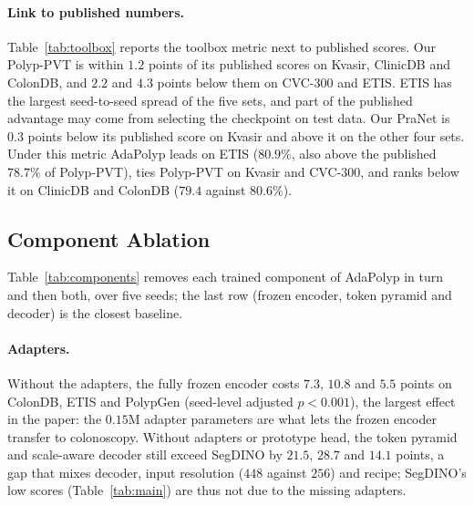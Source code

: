 \documentclass{ieeeaccess}
\begin{document}
\paragraph{Link to published numbers.} Table~\ref{tab:toolbox} reports the toolbox metric next to published scores. Our Polyp-PVT is within $1.2$ points of its published scores on Kvasir, ClinicDB and ColonDB, and $2.2$ and $4.3$ points below them on CVC-300 and ETIS. ETIS has the largest seed-to-seed spread of the five sets, and part of the published advantage may come from selecting the checkpoint on test data. Our PraNet is $0.3$ points below its published score on Kvasir and above it on the other four sets. Under this metric AdaPolyp leads on ETIS ($80.9\%$, also above the published $78.7\%$ of Polyp-PVT), ties Polyp-PVT on Kvasir and CVC-300, and ranks below it on ClinicDB and ColonDB ($79.4$ against $80.6\%$).

\subsection{Component Ablation}
\label{sec:components}
\begin{table}[!t]
  \centering
  \caption{\textbf{Component ablation of AdaPolyp.} Dice (\%) at threshold $0.5$, mean $\pm$ SD over $5$ seeds, same recipe, evaluator and T4 hardware. \mbox{\unboldmath$\Delta$}: mean Dice difference on the primary cohorts, AdaPolyp minus the variant (pp). $^{*}$: significant at the seed level after Holm correction over the three cohorts (paired $t$-test). Params and Trained in millions.}
  \label{tab:components}
  \vspace{2pt}
  \setlength{\tabcolsep}{4pt}
\end{table}
Table~\ref{tab:components} removes each trained component of AdaPolyp in turn and then both, over five seeds; the last row (frozen encoder, token pyramid and decoder) is the closest baseline.

\paragraph{Adapters.} Without the adapters, the fully frozen encoder costs $7.3$, $10.8$ and $5.5$ points on ColonDB, ETIS and PolypGen (seed-level adjusted $p<0.001$), the largest effect in the paper: the $0.15$M adapter parameters are what lets the frozen encoder transfer to colonoscopy. Without adapters or prototype head, the token pyramid and scale-aware decoder still exceed SegDINO by $21.5$, $28.7$ and $14.1$ points, a gap that mixes decoder, input resolution ($448$ against $256$) and recipe; SegDINO's low scores (Table~\ref{tab:main}) are thus not due to the missing adapters.
\end{document}
